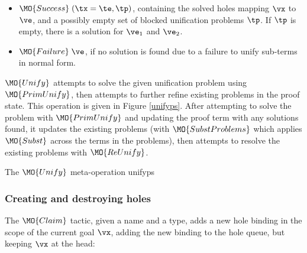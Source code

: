 \begin{itemize}
\item $\MO{Success}\;(\tx=\te, \tp)$, containing the solved holes mapping
$\vx$ to $\ve$, and a possibly empty set of blocked unification problems $\tp$.
If $\tp$ is empty, there is a solution for $\ve_1$ and $\ve_2$. 
\item $\MO{Failure}\;\ve$, if no solution is found due to a failure to unify
sub-terms in normal form.
\end{itemize}

$\MO{Unify}$ attempts to solve the given unification problem using
$\MO{PrimUnify}$,
then attempts to further refine existing problems in the proof
state. This operation is given in Figure \ref{unifyps}. After attempting to
solve the problem with $\MO{PrimUnify}$ and updating the proof term with
any solutions found, it updates the existing problems (with $\MO{SubstProblems}$
which applies $\MO{Subst}$ across the terms in the problems), then attempts to
resolve the existing problems with $\MO{ReUnify}$.

{The $\MO{Unify}$ meta-operation}
{unifyps}


\subsubsection{Creating and destroying holes}

The $\MO{Claim}$ tactic, given a name and a type, adds a new hole binding in
the scope of the current goal $\vx$, adding the new binding to the hole queue, but
keeping $\vx$ at the head:


